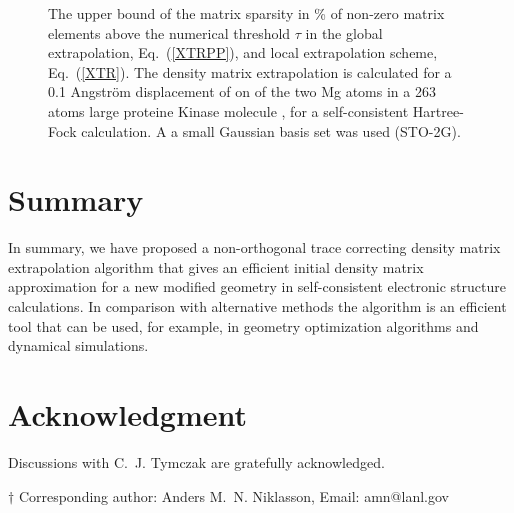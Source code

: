 \documentclass[twocolumn,showpacs,preprintnumbers,amsmath,amssymb]{revtex4}
\begin{document}
\begin{figure}[t]
\caption{\label{FigComp}
The upper bound of the matrix sparsity in \% of non-zero matrix elements above
the numerical threshold $\tau$ in the global extrapolation, Eq.\ (\ref{XTRPP}),
and local extrapolation scheme, Eq.\ (\ref{XTR}). The density matrix extrapolation
is calculated for a 0.1 Angstr\"{o}m displacement of on of the two Mg atoms in a 263 atoms
large proteine Kinase molecule \cite{Nemeth04}, for a self-consistent Hartree-Fock calculation. 
A a small Gaussian basis set was used (STO-2G).}
\end{figure}

\section{Summary}

In summary, we have proposed a non-orthogonal trace correcting density matrix extrapolation 
algorithm that gives an efficient initial density matrix approximation for a new modified
geometry in self-consistent electronic structure calculations. In comparison with alternative 
methods the algorithm is an efficient tool that can be used, for example, in geometry optimization 
algorithms and dynamical simulations.

\section{Acknowledgment}

Discussions with C.\ J. Tymczak are gratefully acknowledged.



{${\dagger}$ Corresponding author: Anders M.\ N. Niklasson, Email: amn@lanl.gov}                                                                                
\end{document}
